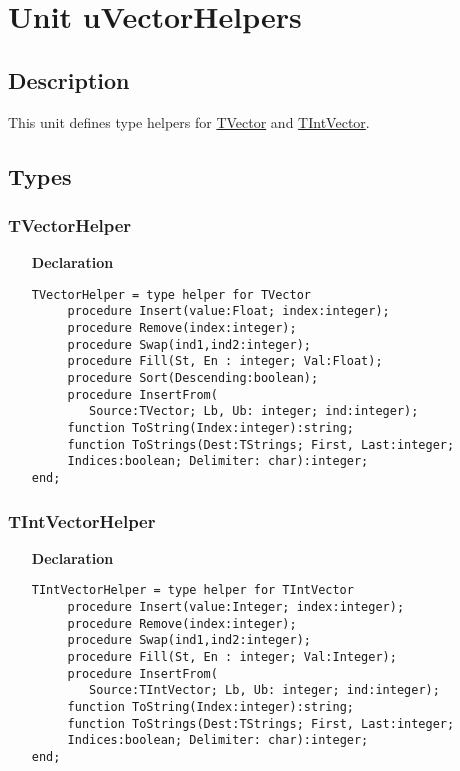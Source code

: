 \documentclass[12pt,a4paper,oneside]{report}
\newcommand{\lmath}[1]{   %
	\marginpar{\vspace{#1} 
		\begin{flushright}
			LMath
	\end{flushright} }
}
\newcommand{\declarationitem}[1]{\textbf{#1}}
\begin{document}
\section{Unit uVectorHelpers}
\lmath{-28pt}
\subsection{Description}
This unit defines type helpers for \hyperref[utypes-TVector]{TVector} and \hyperref[utypes-TIntVector]{TIntVector}.
\subsection{Types}
\subsubsection{TVectorHelper}
\begin{itemize}
\item[\declarationitem{Declaration}\hfill]
	\begin{verbatim}
TVectorHelper = type helper for TVector
     procedure Insert(value:Float; index:integer);
     procedure Remove(index:integer);
     procedure Swap(ind1,ind2:integer);
     procedure Fill(St, En : integer; Val:Float);
     procedure Sort(Descending:boolean);
     procedure InsertFrom(
     	Source:TVector; Lb, Ub: integer; ind:integer);
     function ToString(Index:integer):string;
     function ToStrings(Dest:TStrings; First, Last:integer;
     Indices:boolean; Delimiter: char):integer;
end;
	\end{verbatim}
\end{itemize}
\subsubsection{TIntVectorHelper}
\begin{itemize}
	\item[\declarationitem{Declaration}\hfill]
	\begin{verbatim}
TIntVectorHelper = type helper for TIntVector
     procedure Insert(value:Integer; index:integer);
     procedure Remove(index:integer);
     procedure Swap(ind1,ind2:integer);
     procedure Fill(St, En : integer; Val:Integer);
     procedure InsertFrom(
     	Source:TIntVector; Lb, Ub: integer; ind:integer);
     function ToString(Index:integer):string;
     function ToStrings(Dest:TStrings; First, Last:integer;
     Indices:boolean; Delimiter: char):integer;
end;
	\end{verbatim}
\end{itemize}
\end{document}
